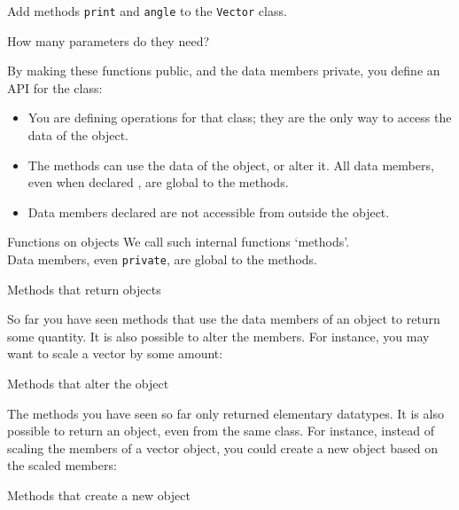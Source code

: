 \begin{exercise}
  \label{ex:vectorclass-print}
  Add methods \lstinline{print} and \lstinline{angle} to the \lstinline{Vector} class.

  How many parameters do they need?
\end{exercise}

By making these functions public, and the data members
private, you define an \acf{API} for the class:
\begin{itemize}
\item You are defining operations for that class; they are the only
  way to access the data of the object.
\item The methods can use the data of the object, or alter it. All
  data members, even when declared , are global to the methods.
\item  Data members declared  are not accessible from outside the
  object.
\end{itemize}

\begin{slide}{Functions on objects}
  \label{sl:obj-func}
  We call such internal functions `methods'.\\
  Data members, even \lstinline{private}, are global to the methods.
\end{slide}

 {Methods that return objects}

So far you have seen methods that use the data members of an object to
return some quantity. It is also possible to alter the members. 
For instance, you may want to scale a vector by some amount:
%

\begin{slide}{Methods that alter the object}
  \label{sl:obj-func-on}
\end{slide}

The methods you have seen so far only returned elementary
datatypes. It is also possible to return an object, even from the same
class. For instance, instead of scaling the members of a vector object, you
could create a new object based on the scaled members:
%

\begin{slide}{Methods that create a new object}
  \label{sl:obj-return}
\end{slide}

